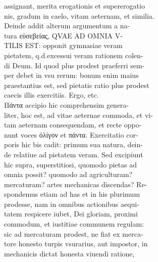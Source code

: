 \documentclass{article}
\begin{document}
\begin{pages}
                assignant, merita erogationis et supererogatio \\
                nis, gradum in caelo, vitam aeternam, et similia. \\
                Deinde addit alterum argumentum a na- \\
                tura εὐσεβείας, QVAE AD OMNIA V- \\
                TILIS EST: opponit gymnasiae veram \\
                pietatem, q.d.excessui veram rationem colen- \\
                di Deum. Id quod plus prodest praeferri sem- \\
                per debet in vsu rerum: bonum enim maius \\
                praestantius est, sed pietatis ratio plus prodest \\
                caecis illis exercitiis. Ergo, etc. \\
                Πάντα accipio hic comprehensim genera- \\
                liter, hoc est, ad vitae aeternae commoda, et vi- \\
                tam aeternam consequendam, et recte oppo- \\
                nunt voces ὀλίγον et πάντα. Exercitatio cor- \\
                poris hic bis cadit: primum sua natura, dein- \\
                de relatiue ad pietatem veram. Sed excipiunt \\
                hic supra, superstitiosi, quomodo pietas ad \\
                omnia possit? quomodo ad agriculturam? \\
                mercaturam? artes mechanicas discendas? Re- \\
                spondemus etiam ad has et in his plurimum \\
                prodesse, nam in omnibus actionibus aequi- \\
                tatem respicere iubet, Dei gloriam, proximi \\
                commodum, et iustitiae communem regulam: \\
                sic ad mercaturam prodest, ne fiat ex merca- \\
                tore honesto turpis vsurarius, aut impostor, in \\
                mechanicis dictat honesta viuendi ratione, \\

\end{pages}
\end{document}

